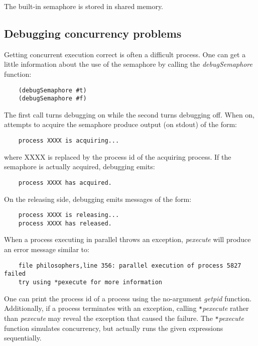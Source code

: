 The built-in semaphore is stored in shared memory.

\subsection{Debugging concurrency problems}

Getting concurrent execution correct is often a difficult process.
One can get a little information about the use of the semaphore 
by calling the {\it debugSemaphore} function:

\begin{verbatim}
    (debugSemaphore #t)
    (debugSemaphore #f)
\end{verbatim}

The first call turns debugging on while the second turns debugging off. When
on, attempts to acquire the semaphore produce output (on stdout) of
the form:

\begin{verbatim}
    process XXXX is acquiring...
\end{verbatim}

where XXXX is replaced by the process id of the acquiring process.
If the semaphore is actually acquired, debugging emits:

\begin{verbatim}
    process XXXX has acquired.
\end{verbatim}

On the releasing side, debugging emits messages of the form:

\begin{verbatim}
    process XXXX is releasing...
    process XXXX has released.
\end{verbatim}

When a process executing in parallel throws an exception, {\it pexecute} will
produce an error message similar to:

\begin{verbatim}
    file philosophers,line 356: parallel execution of process 5827 failed
    try using *pexecute for more information
\end{verbatim}

One can print the process id of a process
using the no-argument {\it getpid} function.
Additionally, if a process terminates with an exception,
calling \verb!*!{\it pexecute} rather than {\it pexecute} may reveal the
exception that caused the failure.
The \verb!*!{\it pexecute} function simulates concurrency, but actually runs the
given expressions sequentially.
